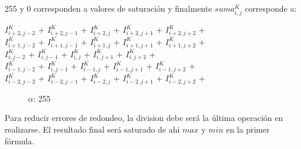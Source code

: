 255 y 0 corresponden a valores de saturación y finalmente $suma_{i,j}^{K}$ corresponde a:

\begin{center}
$I_{i+2,j-2}^{K}$ + $I_{i+2,j-1}^{K}$ + $I_{i+2,j}^{K}$ + $I_{i+2,j+1}^{K}$ + $I_{i+2,j+2}^{K}$ +\\
$I_{i+1,j-2}^{K}$ + $I_{i+1,j-1}^{K}$ + $I_{i+1,j}^{K}$ + $I_{i+1,j+1}^{K}$ + $I_{i+1,j+2}^{K}$ +\\
$I_{i,j-2}^{K}$ + $I_{i,j-1}^{K}$ + $I_{i,j}^{K}$ + $I_{i,j+1}^{K}$ + $I_{i,j+2}^{K}$ +\\
$I_{i-1,j-2}^{K}$ + $I_{i,j-1}^{K}$ + $I_{i-1,j}^{K}$ + $I_{i-1,j+1}^{K}$ + $I_{i-1,j+2}^{K}$ +\\ 
$I_{i-2,j-2}^{K}$ + $I_{i-2,j-1}^{K}$ + $I_{i-2,j}^{K}$ + $I_{i-2,j+1}^{K}$ + $I_{i-2,j+2}^{K}$ +\\
\end{center}

\newpage

\begin{figure}
  \centering
  \hfill
  \caption{$\alpha$: 255}
\end{figure}


Para reducir errores de redondeo, la division debe será la última operación en realizarse.
El resultado final será saturado de ahi $max$ y $min$ en la primer fórmula.

